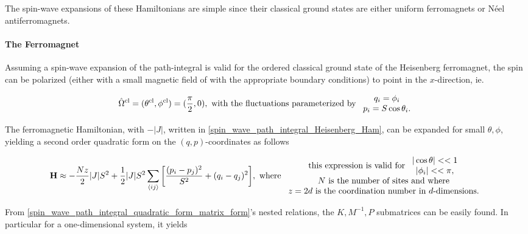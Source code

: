 \documentclass{homework}
\begin{document}
The spin-wave expansions of these Hamiltonians are simple since their classical ground states are either uniform ferromagnets or Néel antiferromagnets. \\

\paragraph{The Ferromagnet}

Assuming a spin-wave expansion of the path-integral is valid for the ordered classical ground state of the Heisenberg ferromagnet, the spin can be polarized (either with a small magnetic field of with the appropriate boundary conditions) to point in the $x$-direction, ie.

\begin{equation}
    \hat{\Omega}^{\textnormal{cl}} = (\theta^{\textnormal{cl}}, \phi^{\textnormal{cl}}) = (\frac{\pi}{2}, 0), \textnormal{ with the fluctuations parameterized by } \begin{array}{cc}
        q_i = \phi_i  \\
        p_i = S \cos \theta_i.
    \end{array}
\end{equation}

The ferromagnetic Hamiltonian, with $-|J|$, written in \cref{spin_wave_path_integral_Heisenberg_Ham}, can be expanded for small $\theta, \phi$, yielding a second order quadratic form on the $(q, p)$-coordinates as follows

\begin{equation}
    {\bf H} \approx - \frac{Nz}{2} |J| S^2 + \frac{1}{2} |J| S^2 \sum_{ \langle ij \rangle } \bigg[ \frac{(p_i - p_j)^2}{S^2} + (q_i - q_j)^2\bigg], \textnormal{ where } \begin{array}{cc}
         \textnormal{ this expression is valid for } \begin{array}{cc}
              |\cos \theta| << 1  \\
              |\phi_i| << \pi,
         \end{array} \\
         \textnormal{ $N$ is the number of sites and where } \\
         \textnormal{$z = 2d$ is the coordination number in $d$-dimensions.}
    \end{array}
\end{equation}

From \cref{spin_wave_path_integral_quadratic_form_matrix_form}'s nested relations, the $K, M^{-1}, P$ submatrices can be easily found. In particular for a one-dimensional system, it yields 
\end{document}
